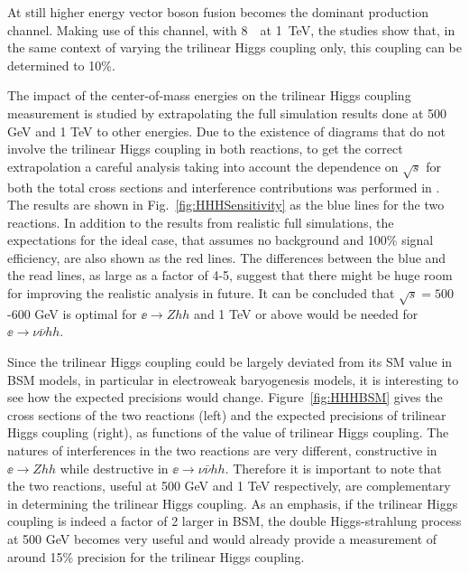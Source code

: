 At still higher energy vector boson fusion becomes the dominant
production channel. Making use of this channel, with  8~\iab\ at
1~TeV, the studies \cite{Tian:2013qmi,KurataHHH,Roloff:2019crr} show that, in the
same context of varying the trilinear Higgs coupling only, this
coupling can be determined to 10\%. 

The impact of the center-of-mass energies on the trilinear Higgs coupling
measurement is studied by extrapolating the full simulation results done 
at 500 GeV and 1 TeV to other energies. Due to the existence of diagrams 
that do not involve the trilinear Higgs coupling in both reactions, 
to get the correct extrapolation a careful 
analysis taking into account the dependence on $\sqrt{s}$ for both the
total cross sections and interference contributions was performed in \cite{TianHHH:2015}.
The results are shown in Fig.~\ref{fig:HHHSensitivity} as the blue lines for the two reactions. 
In addition to the results from realistic full simulations, the expectations for
the ideal case, that assumes no background and 100\% signal efficiency,
are also shown as the red lines. The differences between the blue and the read lines,
as large as a factor of 4-5, suggest that there might be huge room for improving
the realistic analysis in future. It can be concluded that $\sqrt{s}=500$-600 GeV is
optimal for $\ee\to Zhh$ and 1 TeV or above would be needed for $\ee\to\nu\bar{\nu}hh$. 

Since the trilinear Higgs coupling could be largely deviated from its SM value
in BSM models, in particular in electroweak baryogenesis models, 
it is interesting to see how the expected precisions would change.
Figure~\ref{fig:HHHBSM} gives the cross sections of the two reactions (left) and
the expected precisions of trilinear Higgs coupling (right),
as functions of the value of trilinear Higgs coupling. The natures of interferences in 
the two reactions are very different, constructive in $\ee\to Zhh$ while destructive 
in $\ee\to\nu\bar{\nu}hh$. Therefore it is important to note that 
the two reactions, useful at 500 GeV and 1 TeV
respectively, are complementary in determining the trilinear Higgs coupling. 
As an emphasis, if the trilinear Higgs coupling is indeed a factor of 2 larger in BSM,
the double Higgs-strahlung process at 500 GeV becomes very useful and 
would already provide 
a measurement of around 15\% precision for the trilinear Higgs coupling.



